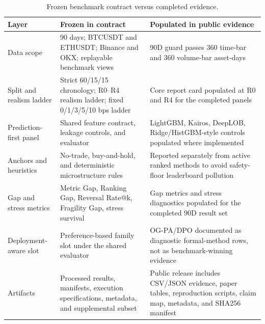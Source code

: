 \begin{table}[t]
\centering
\caption{Frozen benchmark contract versus completed evidence.}
\label{tab:table_23_contract_vs_evidence}
\begin{tabular}{lll}
\toprule
Layer & Frozen in contract & Populated in public evidence \\
\midrule
Data scope & 90 days; BTCUSDT and ETHUSDT; Binance and OKX; replayable benchmark views & 90D guard passes 360 time-bar and 360 volume-bar asset-days \\
Split and realism ladder & Strict 60/15/15 chronology; R0–R4 realism ladder; fixed 0/1/3/5/10 bps ladder & Core report card populated at R0 and R4 for the completed panels \\
Prediction-first panel & Shared feature contract, leakage controls, and evaluator & LightGBM, Kairos, DeepLOB, Ridge/HistGBM-style controls populated where implemented \\
Anchors and heuristics & No-trade, buy-and-hold, and deterministic microstructure rules & Reported separately from active ranked methods to avoid safety-floor leaderboard pollution \\
Gap and stress metrics & Metric Gap, Ranking Gap, Reversal Rate@k, Fragility Gap, stress survival & Gap metrics and stress diagnostics populated for the completed 90D result set \\
Deployment-aware slot & Preference-based family slot under the shared evaluator & OG-PA/DPO documented as diagnostic formal-method rows, not as benchmark-winning evidence \\
Artifacts & Processed results, manifests, execution specifications, metadata, and supplemental subset & Public release includes CSV/JSON evidence, paper tables, reproduction scripts, claim map, metadata, and SHA256 manifest \\
\bottomrule
\end{tabular}
\end{table}
